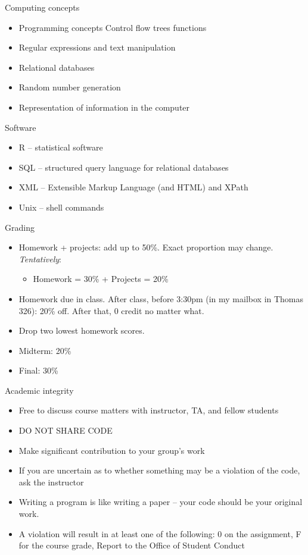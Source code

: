 \documentclass{beamer}\usepackage[]{graphicx}\usepackage[]{color}
\theoremstyle{mystyle}
\begin{document}
\begin{frame}{Computing concepts}
\begin{itemize}
\item Programming concepts
Control flow
trees
functions
\item Regular expressions and text manipulation 
\item Relational databases
\item Random number generation
\item Representation of information in the computer 
\end{itemize}
\end{frame}

\begin{frame}{Software}
\begin{itemize}
\item R – statistical software
\item SQL – structured query language for relational databases
\item XML – Extensible Markup Language (and HTML) and XPath
\item Unix – shell commands
\end{itemize}
\end{frame}

\begin{frame}{Grading}
\begin{itemize}
  \item Homework + projects: add up to 50\%. Exact proportion may
    change. {\it Tentatively}:
    \begin{itemize}
    \item Homework = 30\% + Projects = 20\%
    \end{itemize}
    \item Homework due in class. After class, before 3:30pm (in my mailbox in Thomas 326): 20\% off. After that, 0 credit no matter what.
  \item Drop two lowest homework scores. 
  \item Midterm: 20\%
  \item Final: 30\%
\end{itemize}
\end{frame}

\begin{frame}{Academic integrity}
\begin{itemize}
\item Free to discuss course matters with instructor, TA, and fellow students
\item DO NOT SHARE CODE 
\item Make significant contribution to your group’s work
\item If you are uncertain as to whether something may be a violation of the code, ask the instructor 
\item Writing a program is like writing a paper – your code should be your original work.  
\item A violation will result in at least one of the following:
0 on the assignment, 
F for the course grade, 
Report to the Office of Student Conduct
\end{itemize}
\end{frame}
\end{document}
